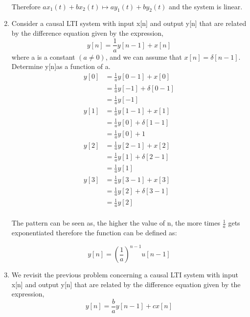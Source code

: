 \documentclass{article}
\begin{document}
\begin{enumerate}
\begin{align}
    \end{align}
    \begin{center}
            Therefore $ax_1(t) + bx_2(t) \mapsto ay_1(t) + by_2(t)$ and the system is linear.
        \end{center}
    \newpage
    \item Consider a causal LTI system with input x[n] and output y[n] that are related by the difference equation given by the expression,
    \begin{equation}
        y[n] = \frac{1}{a}y[n-1]+x[n]   
    \end{equation}
    where a is a constant $(a \ne 0)$, and we can assume that $x[n] = \delta[n-1]$.  Determine y[n]as a function of a.
    \begin{align}
        y[0] &= \frac{1}{a}y[0-1]+x[0]   \\
        &= \frac{1}{a}y[-1]+\delta[0-1]   \\
        &= \frac{1}{a}y[-1]   \\
        y[1] &= \frac{1}{a}y[1-1]+x[1]   \\
        &= \frac{1}{a}y[0]+\delta[1-1]   \\
        &= \frac{1}{a}y[0]+ 1   \\
        y[2] &= \frac{1}{a}y[2-1]+x[2]   \\
        &= \frac{1}{a}y[1]+\delta[2-1]   \\
        &= \frac{1}{a}y[1]   \\
        y[3] &= \frac{1}{a}y[3-1]+x[3]   \\
        &= \frac{1}{a}y[2]+\delta[3-1]   \\
        &= \frac{1}{a}y[2]   \\
    \end{align}
    \begin{center}
        The pattern can be seen as, the higher the value of n, the more times $\frac{1}{a}$ gets exponentiated therefore the function can be defined as:
    \end{center}
    \begin{equation}
        y[n] = \left(\frac{1}{a}\right)^{n-1} u[n-1]
    \end{equation}
    \newpage
    \item We revisit the previous problem concerning a causal LTI system with input x[n] and output y[n] that are related by the difference equation given by the expression,
    \begin{equation}
        y[n] = \frac{b}{a}y[n-1] + cx[n]
    \end{equation}

\end{enumerate}
\end{document}

